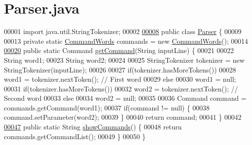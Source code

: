 \hypertarget{Parser_8java_source}{\section{Parser.\-java}
}

\begin{DoxyCode}
00001 \textcolor{keyword}{import} java.util.StringTokenizer;
00002 
\hypertarget{Parser_8java_source_l00008}{}\hyperlink{classParser}{00008} \textcolor{keyword}{public} \textcolor{keyword}{class }\hyperlink{classParser}{Parser} \{
00009 
00013     \textcolor{keyword}{private} \textcolor{keyword}{static} \hyperlink{classCommandWords}{CommandWords} commands = \textcolor{keyword}{new} \hyperlink{classCommandWords}{CommandWords}();
00014 
\hypertarget{Parser_8java_source_l00020}{}\hyperlink{classParser_a4b9b987a0c1b0f4f742020f1be21edfa}{00020}     \textcolor{keyword}{public} \textcolor{keyword}{static} Command \hyperlink{classParser_a4b9b987a0c1b0f4f742020f1be21edfa}{getCommand}(String inputLine) \{
00021 
00022         String word1;
00023         String word2;
00024 
00025         StringTokenizer tokenizer = \textcolor{keyword}{new} StringTokenizer(inputLine);
00026 
00027         \textcolor{keywordflow}{if}(tokenizer.hasMoreTokens())
00028             word1 = tokenizer.nextToken();  \textcolor{comment}{// First word}
00029         \textcolor{keywordflow}{else}
00030             word1 = null;
00031         \textcolor{keywordflow}{if}(tokenizer.hasMoreTokens())
00032             word2 = tokenizer.nextToken();  \textcolor{comment}{// Second word}
00033         \textcolor{keywordflow}{else}
00034             word2 = null;
00035 
00036         Command command = commands.getCommand(word1);
00037         \textcolor{keywordflow}{if}(command != null) \{
00038             command.setParameter(word2);
00039         \}
00040         \textcolor{keywordflow}{return} command;
00041     \}
00042 
\hypertarget{Parser_8java_source_l00047}{}\hyperlink{classParser_a2510fee1c8d7298e222edaf1f34660dc}{00047}     \textcolor{keyword}{public} \textcolor{keyword}{static} String \hyperlink{classParser_a2510fee1c8d7298e222edaf1f34660dc}{showCommands}() \{
00048         \textcolor{keywordflow}{return} commands.getCommandList();
00049     \}
00050 \}
\end{DoxyCode}
